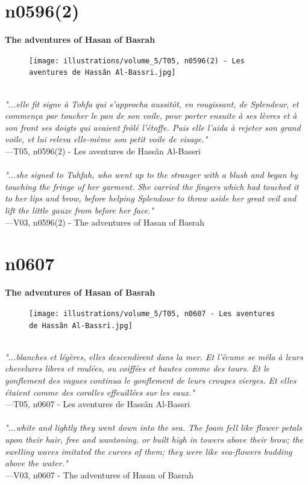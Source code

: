 \documentclass[../Carre_nights.tex]{subfiles}
\begin{document}
\newpage

\section{n0596(2)}
\textbf{\Large{The adventures of Hasan of Basrah}} \\

\begin{figure}[ht]
\centering
\texttt{[image: illustrations/volume\_5/T05, n0596(2) - Les aventures de Hassân Al-Bassri.jpg]}
\end{figure}

\textit{\\
"...elle fit signe à Tohfa qui s’approcha aussitôt, en rougissant, de Splendeur, et commença par toucher le pan de son voile, pour porter ensuite à ses lèvres et à son front ses doigts qui avaient frôlé l’étoffe. Puis elle l’aida à rejeter son grand voile, et lui releva elle-même son petit voile de visage."} \\
—T05, n0596(2) - Les aventures de Hassân Al-Bassri \\~\\
\textit{"...she signed to Tuhfah, who went up to the stranger with a blush and began by touching the fringe of her garment. She carried the fingers which had touched it to her lips and brow, before helping Splendour to throw aside her great veil and lift the little gauze from before her face."} \\
—V03, n0596(2) - The adventures of Hasan of Basrah

\newpage

\section{n0607}
\textbf{\Large{The adventures of Hasan of Basrah}} \\

\begin{figure}[ht]
\centering
\texttt{[image: illustrations/volume\_5/T05, n0607 - Les aventures de Hassân Al-Bassri.jpg]}
\end{figure}

\textit{\\
"...blanches et légères, elles descendirent dans la mer. Et l’écume se mêla à leurs chevelures libres et roulées, ou coiffées et hautes comme des tours. Et le gonflement des vagues continua le gonflement de leurs croupes vierges. Et elles étaient comme des corolles effeuillées sur les eaux."} \\
—T05, n0607 - Les aventures de Hassân Al-Bassri \\~\\
\textit{"...white and lightly they went down into the sea. The foam fell like flower petals upon their hair, free and wantoning, or built high in towers above their brow; the swelling waves imitated the curves of them; they were like sea-flowers budding above the water."} \\
—V03, n0607 - The adventures of Hasan of Basrah
\end{document}
